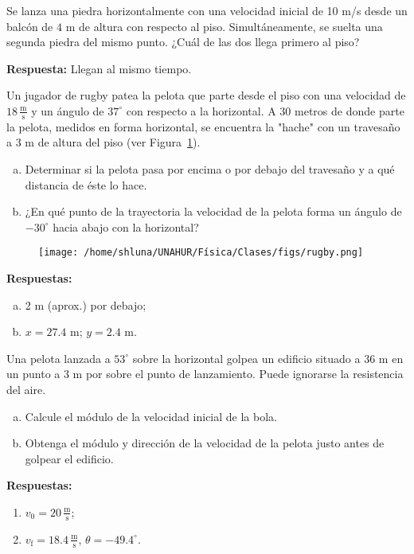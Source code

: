 \documentclass[addpoints]{exam}
\newcommand{\grado}[0]{^{\circ}}
\newcommand{\rta}{\textbf{Respuesta: }}
\newcommand{\rtas}{\textbf{Respuestas: }}
\begin{document}
\begin{questions}
    \question Se lanza una piedra horizontalmente con una velocidad inicial de 10 m/s desde un balcón de $4$ m de altura con respecto al piso. Simultáneamente, se suelta una segunda piedra del mismo punto. ¿Cuál de las dos llega primero al piso? 
    
    \rta Llegan al mismo tiempo.

    \question Un jugador de rugby patea la pelota que parte desde el piso con una velocidad de $18 \, \frac{\text{m}}{\text{s}}$ y un ángulo de $37\grado$ con respecto a la horizontal. A 30 metros de donde parte la pelota, medidos en forma horizontal, se encuentra la "hache" con un travesaño a 3 m de altura del piso (ver Figura~\ref{fig:rugby}). 
    \begin{enumerate}[a)]
        \item Determinar si la pelota pasa por encima o por debajo del travesaño y a qué distancia de éste lo hace.
        \item ¿En qué punto de la trayectoria la velocidad de la pelota forma un ángulo de $-30\grado$ hacia abajo con la horizontal?
    \end{enumerate}

    \begin{figure}[ht]
        \centering
        \texttt{[image: /home/shluna/UNAHUR/Física/Clases/figs/rugby.png]}
        \caption{ }
        \label{fig:rugby}
    \end{figure}

    \rtas 
    \begin{enumerate}[a)]
        \item 2 m (aprox.) por debajo;
        \item $x=27.4$ m; $y = 2.4$ m.
    \end{enumerate}

    \question Una pelota lanzada a $53\grado$ sobre la horizontal golpea un edificio situado a 36 m en un punto a 3 m por sobre el punto de lanzamiento. Puede ignorarse la resistencia del aire. 
    \begin{enumerate}[a)]
        \item Calcule el módulo de la velocidad inicial de la bola.
        \item Obtenga el módulo y dirección de la velocidad de la pelota justo antes de golpear el edificio.
    \end{enumerate}

    \rtas
    \begin{enumerate}
        \item $v_0 = 20 \, \frac{\text{m}}{\text{s}}$;
        \item $v_\text{f} = 18.4 \, \frac{\text{m}}{\text{s}}$, $\theta = - 49.4\grado$.
    \end{enumerate}


\end{questions}
\end{document}
